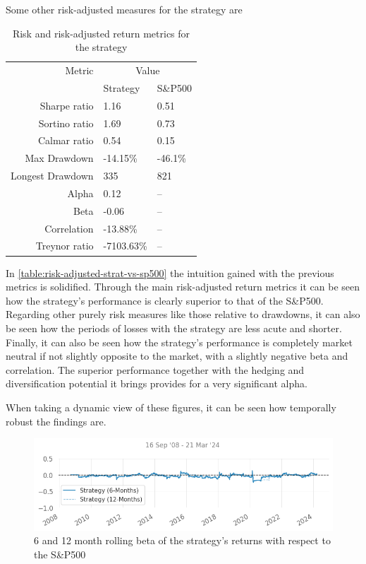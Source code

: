 Some other risk-adjusted measures for the strategy are 
\begin{table}[ht]
    \centering
    \begin{tabular}{rll}
        \toprule
        Metric & \multicolumn{2}{c}{Value} \\ 
        \cmidrule(lr){2-3}
            & Strategy & S\&P500 \\
        \midrule
        Sharpe ratio & 1.16 & 0.51 \\
        Sortino ratio & 1.69 & 0.73 \\
        Calmar ratio & 0.54 & 0.15 \\
        Max Drawdown & -14.15\% & -46.1\% \\
        Longest Drawdown & 335 & 821 \\
        Alpha & 0.12 & -- \\
        Beta & -0.06 & -- \\
        Correlation & -13.88\% & -- \\
        Treynor ratio & -7103.63\% & -- \\
        \bottomrule
    \end{tabular}
    \caption{Risk and risk-adjusted return metrics for the strategy}
    \label{table:risk-adjusted-strat-vs-sp500}
\end{table}

In \autoref{table:risk-adjusted-strat-vs-sp500} the intuition gained with the previous metrics is solidified. Through the main risk-adjusted return metrics it can be seen how the strategy's performance is clearly superior to that of the S\&P500. Regarding other purely risk measures like those relative to drawdowns, it can also be seen how the periods of losses with the strategy are less acute and shorter. Finally, it can also be seen how the strategy's performance is completely market neutral if not slightly opposite to the market, with a slightly negative beta and correlation. The superior performance together with the hedging and diversification potential it brings provides for a very significant alpha. 

When taking a dynamic view of these figures, it can be seen how temporally robust the findings are.

\begin{figure}[ht]
    \includegraphics[width=\linewidth]{assets/strat-vs-sp500-rolling-beta.png}
    \caption{6 and 12 month rolling beta of the strategy's returns with respect to the S\&P500}
    \label{fig:strat-vs-sp500-rolling-beta}
\end{figure}

